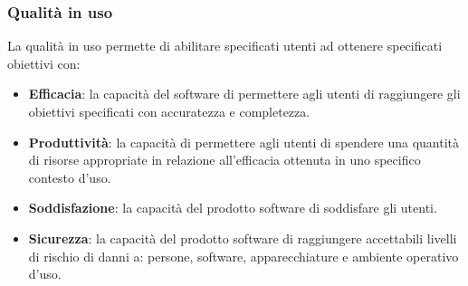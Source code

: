 \subsubsection{Qualità in uso}
La qualità in uso permette di abilitare specificati utenti ad ottenere specificati obiettivi con:
\begin{itemize}
	\item \textbf{Efficacia}: la capacità del software di permettere agli utenti di raggiungere gli obiettivi specificati
	con accuratezza e completezza.
	\item \textbf{Produttività}: la capacità di permettere agli utenti di spendere una quantità di risorse
	appropriate in relazione all'efficacia ottenuta in uno specifico contesto d'uso.
	\item \textbf{Soddisfazione}: la capacità del prodotto software di soddisfare gli utenti.
	\item \textbf{Sicurezza}: la capacità del prodotto software di raggiungere accettabili livelli 
	di rischio di danni a: persone, software, apparecchiature e ambiente operativo d'uso.
\end{itemize}

\setlength\extrarowheight{0pt}
